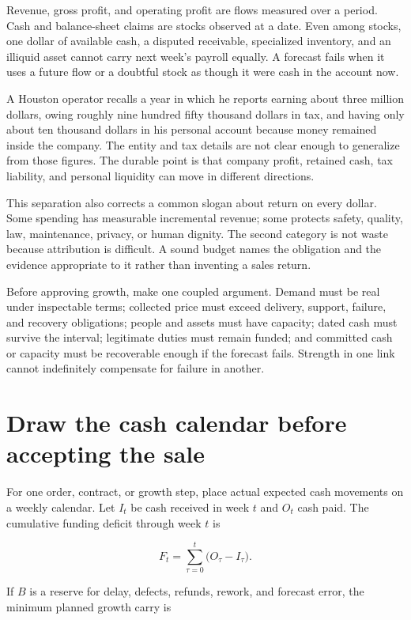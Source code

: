 Revenue, gross profit, and operating profit are flows measured over a period.
Cash and balance-sheet claims are stocks observed at a date. Even among stocks,
one dollar of available cash, a disputed receivable, specialized inventory,
and an illiquid asset cannot carry next week's payroll equally. A forecast
fails when it uses a future flow or a doubtful stock as though it were cash in
the account now.

A Houston operator recalls a year in which he reports earning about three
million dollars, owing roughly nine hundred fifty thousand dollars in tax, and
having only about ten thousand dollars in his personal account because money
remained inside the company. The entity and tax details are not clear enough to
generalize from those figures. The durable point is that company profit,
retained cash, tax liability, and personal liquidity can move in different
directions.

This separation also corrects a common slogan about return on every dollar.
Some spending has measurable incremental revenue; some protects safety,
quality, law, maintenance, privacy, or human dignity. The second category is
not waste because attribution is difficult. A sound budget names the obligation
and the evidence appropriate to it rather than inventing a sales return.

Before approving growth, make one coupled argument. Demand must be real under
inspectable terms; collected price must exceed delivery, support, failure, and
recovery obligations; people and assets must have capacity; dated cash must
survive the interval; legitimate duties must remain funded; and committed cash
or capacity must be recoverable enough if the forecast fails. Strength in one
link cannot indefinitely compensate for failure in another.

\section{Draw the cash calendar before accepting the sale}

For one order, contract, or growth step, place actual expected cash movements on
a weekly calendar. Let \(I_t\) be cash received in week \(t\) and \(O_t\) cash
paid. The cumulative funding deficit through week \(t\) is

\begin{equation}
F_t=\sum_{\tau=0}^{t}\bigl(O_\tau-I_\tau\bigr).
\end{equation}

If \(B\) is a reserve for delay, defects, refunds, rework, and forecast error,
the minimum planned growth carry is

